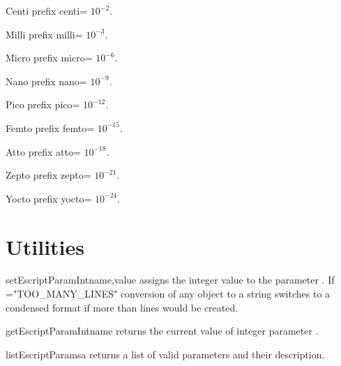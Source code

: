 \begin{datadesc}{Centi}
prefix centi= $10^{-2}$. 
\end{datadesc}

\begin{datadesc}{Milli}
prefix milli= $10^{-3}$.
\end{datadesc}

\begin{datadesc}{Micro}
prefix micro= $10^{-6}$.
 \end{datadesc}

\begin{datadesc}{Nano}
prefix nano= $10^{-9}$.
 \end{datadesc}

\begin{datadesc}{Pico}
prefix pico= $10^{-12}$.
 \end{datadesc}

\begin{datadesc}{Femto}
prefix femto= $10^{-15}$.
 \end{datadesc}

\begin{datadesc}{Atto}
prefix atto= $10^{-18}$.
 \end{datadesc}

\begin{datadesc}{Zepto}
prefix zepto= $10^{-21}$.
 \end{datadesc}

\begin{datadesc}{Yocto}
prefix yocto= $10^{-24}$.
 \end{datadesc}


\section{Utilities}
\begin{funcdesc}{setEscriptParamInt}{name,value}
assigns the integer value  to the parameter .
If ="TOO_MANY_LINES" conversion of any \Data object to a string switches to a 
condensed format if more than  lines would be created.
\end{funcdesc}

\begin{funcdesc}{getEscriptParamInt}{name}
returns the current value of integer parameter . 
\end{funcdesc}

\begin{funcdesc}{listEscriptParams}{a}
returns a list of valid parameters and their description.
\end{funcdesc}

